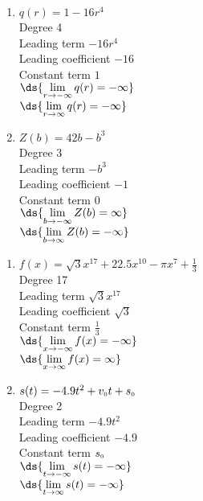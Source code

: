 \documentclass{ximera}
\begin{document}
\begin{enumerate}
\setcounter{enumi}{\value{HW}}

\item $q(r) = 1 - 16r^{4}$\\
Degree 4 \\
Leading term $-16r^{4}$\\
Leading coefficient $-16$\\
Constant term $1$\\
$\ds{\lim_{r \rightarrow - \infty} q(r)  = -\infty}$ \\
$\ds{\lim_{r \rightarrow \infty} q(r)  = -\infty}$ \\


\item $Z(b) = 42b - b^{3}$\\
Degree 3 \\
Leading term $-b^{3}$\\
Leading coefficient $-1$\\
Constant term $0$\\
$\ds{\lim_{b \rightarrow - \infty} Z(b)  = \infty}$ \\
$\ds{\lim_{b \rightarrow  \infty} Z(b)  =  - \infty}$ \\

\setcounter{HW}{\value{enumi}}
\end{enumerate}

\begin{enumerate}
\setcounter{enumi}{\value{HW}}

\item $f(x) = \sqrt{3}x^{17} + 22.5x^{10} - \pi x^{7} + \frac{1}{3}$\\
Degree 17 \\
Leading term $\sqrt{3}x^{17}$\\
Leading coefficient $\sqrt{3}$\\
Constant term $\frac{1}{3}$\\
$\ds{\lim_{x \rightarrow - \infty} f(x)  = -\infty}$ \\
$\ds{\lim_{x \rightarrow  \infty} f(x)  = \infty}$ \\



\item $s(t) = -4.9t^{2} + v_{\mbox{\tiny $0$}}t + s_{\mbox{\tiny $0$}}$\\
Degree 2 \\
Leading term $-4.9t^{2}$\\
Leading coefficient $-4.9$\\
Constant term $s_{\mbox{\tiny $0$}}$\\
$\ds{\lim_{t \rightarrow - \infty} s(t)  = -\infty}$ \\
$\ds{\lim_{t \rightarrow  \infty} s(t)  = -\infty}$ \\



\setcounter{HW}{\value{enumi}}
\end{enumerate}
\end{document}
